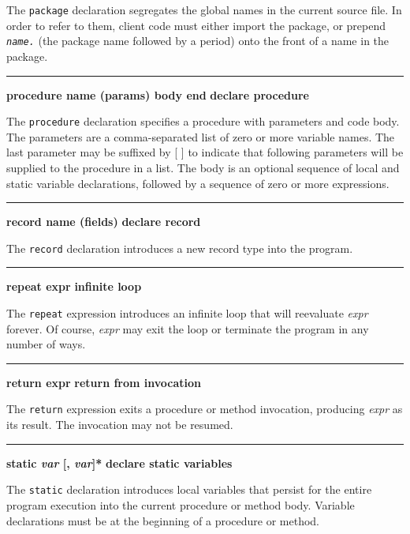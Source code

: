 \noindent
{}The \texttt{package} declaration segregates the global
names in the current source file. In order to refer to them, client
code must either import the package, or prepend
\texttt{\textit{name.}} (the package name followed by a period)
onto the front of a name in the package.

\bigskip\hrule\vspace{0.1cm}
\noindent
{\bf procedure name (params) body end } \hfill {\bf declare procedure}

\noindent
{}The \texttt{procedure} declaration specifies a
procedure with parameters and code body. The parameters
are a comma-separated list of zero or more variable names. The last
parameter may be suffixed by [ ] to indicate that
following parameters will be supplied to the procedure in a list. The
body is an optional sequence of local and static variable declarations,
followed by a sequence of zero or more expressions.

\bigskip\hrule\vspace{0.1cm}
\noindent
{\bf record name (fields) } \hfill {\bf declare record}

\noindent
{}The \texttt{record} declaration introduces a new record
type into the program.

\bigskip\hrule\vspace{0.1cm}
\noindent
{\bf repeat expr } \hfill {\bf infinite loop}

\noindent
{}The \texttt{repeat} expression
introduces an infinite loop that will reevaluate \textit{expr} forever.
Of course, \textit{expr} may exit the loop or terminate the program in
any number of ways.

\bigskip\hrule\vspace{0.1cm}
\noindent
{\bf return expr } \hfill {\bf return from invocation}

\noindent
{}The \texttt{return} expression exits a procedure or method
invocation, producing \textit{expr} as its result. The invocation may
not be resumed.

\bigskip\hrule\vspace{0.1cm}
\noindent
{\bf \textbf{static} \textit{var} [, \textit{var}]* } \hfill {\bf declare static variables}

\noindent
{}The \texttt{static} declaration introduces 
local variables that persist for the entire program execution
into the current procedure or method body. Variable
declarations must be at the beginning of a procedure or method.

